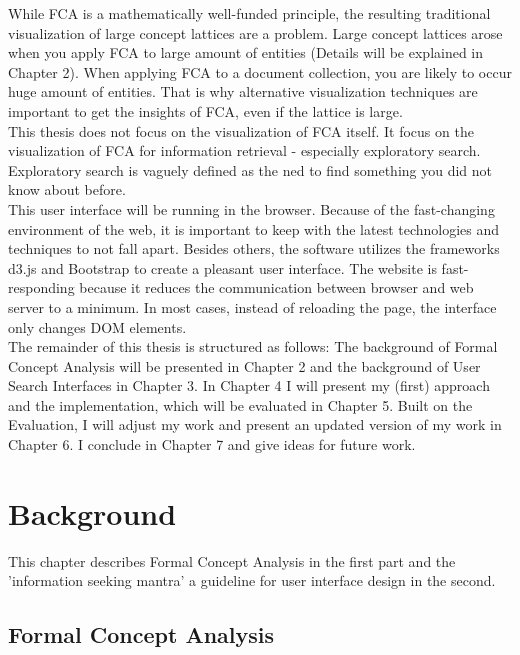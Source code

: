 \documentclass[11pt]{report}
\begin{document}
 While FCA is a mathematically well-funded principle, the resulting traditional visualization of large concept lattices are a problem. Large concept lattices arose when you apply FCA to large amount of entities (Details will be explained in Chapter 2). When applying FCA to a document collection, you are likely to occur huge amount of entities. That is why alternative visualization techniques are important to get the insights of FCA, even if the lattice is large. \\
  
 This thesis does not focus on the visualization of FCA itself. It focus on the visualization of FCA for information retrieval - especially exploratory search. Exploratory search is vaguely defined as the ned to find something you did not know about before. \\
 
This user interface will be running in the browser. Because of the fast-changing environment of the web, it is important to keep with the latest technologies and techniques to not fall apart. Besides others, the software utilizes the frameworks d3.js and Bootstrap to create a pleasant user interface. The website is fast-responding because it reduces the communication between browser and web server to a minimum. In most cases, instead of reloading the page, the interface only changes DOM elements. \\ 
    
 The remainder of this thesis is structured as follows: The background of Formal Concept Analysis will be presented in Chapter 2 and the background of User Search Interfaces in Chapter 3. In Chapter 4 I will present my (first) approach and the implementation, which will be evaluated in Chapter 5. Built on the Evaluation, I will adjust my work and present an updated version of my work in Chapter 6. I conclude in Chapter 7 and give ideas for future work.
 
\chapter{Background}

This chapter describes Formal Concept Analysis in the first part and the 'information seeking mantra' a guideline for user interface design in the second.

\section{Formal Concept Analysis}
\end{document}

